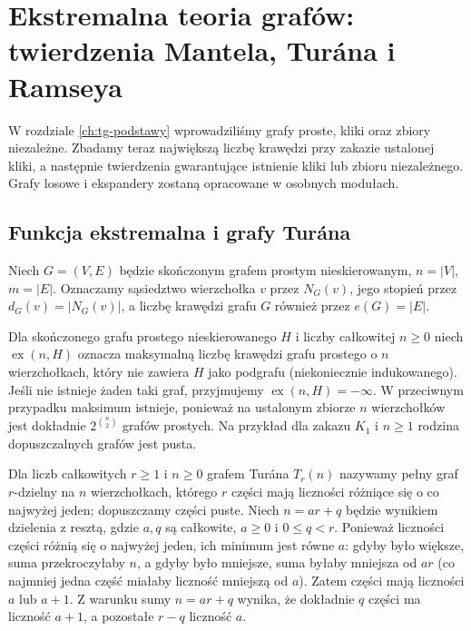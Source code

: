 \chapter{Ekstremalna teoria grafów: twierdzenia Mantela, Turána i Ramseya}
\label{ch:tg-extremal-ramsey}

W rozdziale \ref{ch:tg-podstawy} wprowadziliśmy grafy proste,
kliki oraz zbiory niezależne. Zbadamy teraz największą liczbę
krawędzi przy zakazie ustalonej kliki, a następnie twierdzenia
gwarantujące istnienie kliki lub zbioru niezależnego.
Grafy losowe i ekspandery zostaną opracowane w osobnych modułach.

\section{Funkcja ekstremalna i grafy Turána}
\label{sec:tg-extremal-notation}

Niech $G=(V,E)$ będzie skończonym grafem prostym
nieskierowanym, $n=|V|$, $m=|E|$.
Oznaczamy sąsiedztwo wierzchołka $v$ przez $N_G(v)$,
jego stopień przez $d_G(v)=|N_G(v)|$, a liczbę krawędzi
grafu $G$ również przez $e(G)=|E|$.

\begin{definicja}
\label{def:tg-extremal-ex}
Dla skończonego grafu prostego nieskierowanego $H$ i liczby całkowitej
$n\geq0$ niech $\operatorname{ex}(n,H)$ oznacza maksymalną
liczbę krawędzi grafu prostego o $n$ wierzchołkach,
który nie zawiera $H$ jako podgrafu (niekoniecznie
indukowanego). Jeśli nie istnieje żaden taki graf,
przyjmujemy $\operatorname{ex}(n,H)=-\infty$.
W przeciwnym przypadku maksimum istnieje, ponieważ
na ustalonym zbiorze $n$ wierzchołków jest dokładnie
$2^{\binom n2}$ grafów prostych. Na przykład dla zakazu
$K_1$ i $n\geq1$ rodzina dopuszczalnych grafów jest pusta.
\end{definicja}

\begin{definicja}
\label{def:tg-turan}
Dla liczb całkowitych $r\geq1$ i $n\geq0$ grafem Turána $T_r(n)$
nazywamy pełny graf $r$-dzielny na $n$ wierzchołkach,
którego $r$ części mają liczności różniące się
o co najwyżej jeden; dopuszczamy części puste.
Niech $n=ar+q$ będzie wynikiem dzielenia z resztą,
gdzie $a,q$ są całkowite, $a\geq0$ i $0\leq q<r$.
Ponieważ liczności części różnią się o najwyżej jeden,
ich minimum jest równe $a$: gdyby było większe, suma
przekroczyłaby $n$, a gdyby było mniejsze, suma
byłaby mniejsza od $ar$ (co najmniej jedna część
miałaby liczność mniejszą od $a$).
Zatem części mają liczności $a$ lub $a+1$.
Z warunku sumy $n=ar+q$ wynika, że dokładnie $q$
części ma liczność $a+1$, a pozostałe $r-q$ liczność $a$.
\end{definicja}

